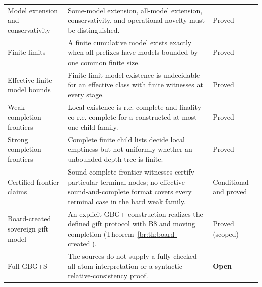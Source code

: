\documentclass[11pt,letterpaper]{article}
\theoremstyle{definition}\newtheorem{definition}[theorem]{Definition}\newtheorem{example}[theorem]{Example}
\theoremstyle{remark}\newtheorem{remark}[theorem]{Remark}
\begin{document}
\begin{longtable}{@{}p{}p{}p{}@{}}
Model extension and conservativity & Some-model extension, all-model extension, conservativity, and operational novelty must be distinguished. & Proved \\
Finite limits & A finite cumulative model exists exactly when all prefixes have models bounded by one common finite size. & Proved \\
Effective finite-model bounds & Finite-limit model existence is undecidable for an effective class with finite witnesses at every stage. & Proved \\
Weak completion frontiers & Local existence is r.e.-complete and finality co-r.e.-complete for a constructed at-most-one-child family. & Proved \\
Strong completion frontiers & Complete finite child lists decide local emptiness but not uniformly whether an unbounded-depth tree is finite. & Proved \\
Certified frontier claims & Sound complete-frontier witnesses certify particular terminal nodes; no effective sound-and-complete format covers every terminal case in the hard weak family. & Conditional and proved \\
Board-created sovereign gift model & An explicit GBG+ construction realizes the defined gift protocol with B8 and moving completion (Theorem~\ref{br:th:board-created}). & Proved (scoped) \\
Full GBG+S & The sources do not supply a fully checked all-atom interpretation or a syntactic relative-consistency proof. & \textbf{Open} \\
\bottomrule
\end{longtable}
\end{document}
